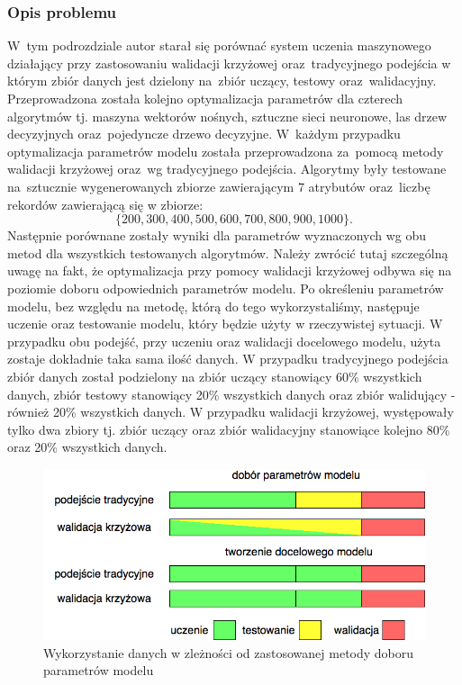 \subsubsection{Opis problemu}
W~tym podrozdziale autor starał się porównać system uczenia maszynowego działający przy zastosowaniu walidacji krzyżowej oraz~tradycyjnego podejścia w którym zbiór danych jest dzielony na~zbiór uczący, testowy oraz~walidacyjny. Przeprowadzona została kolejno optymalizacja parametrów dla czterech algorytmów tj. maszyna wektorów nośnych, sztuczne sieci neuronowe, las drzew decyzyjnych oraz~pojedyncze drzewo decyzyjne. W~każdym przypadku optymalizacja parametrów modelu została przeprowadzona za~pomocą metody walidacji krzyżowej oraz~wg tradycyjnego podejścia.  Algorytmy były testowane na~sztucznie wygenerowanych zbiorze zawierającym 7 atrybutów oraz~liczbę rekordów zawierającą się w zbiorze:
\begin{equation*}
\{200, 300, 400, 500, 600, 700, 800, 900, 1000\}. 
\end{equation*}
Następnie porównane zostały wyniki dla parametrów wyznaczonych wg obu metod dla wszystkich testowanych algorytmów. Należy zwrócić tutaj szczególną uwagę na fakt, że optymalizacja przy pomocy walidacji krzyżowej odbywa się na poziomie doboru odpowiednich parametrów modelu. Po określeniu parametrów modelu, bez względu na metodę, którą do tego wykorzystaliśmy, następuje uczenie oraz testowanie modelu, który będzie użyty w rzeczywistej sytuacji. W przypadku obu podejść, przy uczeniu oraz walidacji docelowego modelu, użyta zostaje dokładnie taka sama ilość danych. W przypadku tradycyjnego podejścia zbiór danych został podzielony na zbiór uczący stanowiący 60\% wszystkich danych, zbiór testowy stanowiący 20\% wszystkich danych oraz zbiór walidujący - również 20\% wszystkich danych. W przypadku walidacji krzyżowej, występowały tylko dwa zbiory tj. zbiór uczący oraz zbiór walidacyjny stanowiące kolejno 80\% oraz 20\% wszystkich danych. %

\begin{figure}[ht!]
\centering
\includegraphics[scale=0.6]{res/cvdata.png}
\caption[Caption for LOF]{Wykorzystanie danych w zleżności od zastosowanej metody doboru parametrów modelu\label{cvdata}}
\end{figure} 

